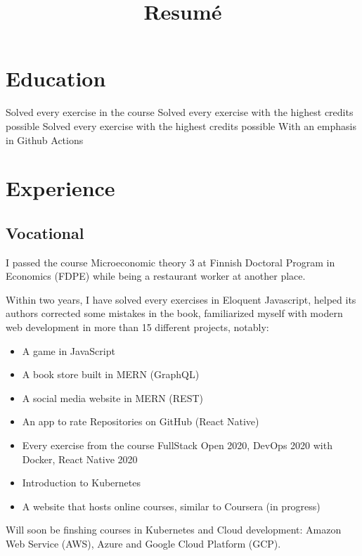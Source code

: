 \documentclass[11pt,a4paper,sans]{moderncv}
\title{Resumé}
\begin{document}
  \makecvtitle

  \section{Education}
  {}
  {Solved every exercise in the course}
  {Solved every exercise with the highest credits possible}
  {Solved every exercise with the highest credits possible}
  {With an emphasis in Github Actions}
  {}

  \section{Experience}
  \subsection{Vocational}
  {}
  {I passed the course Microeconomic theory 3 at Finnish Doctoral Program in Economics (FDPE)
  while being a restaurant worker at another place.}
  {Within two years, I have solved every exercises in Eloquent Javascript, helped its authors
  corrected some mistakes in the book, familiarized myself with modern web
  development in more than 15 different projects, notably:
  \begin{itemize}
    \item A game in JavaScript
    \item A book store built in MERN (GraphQL)
    \item A social media website in MERN (REST)
    \item An app to rate Repositories on GitHub (React Native)
    \item Every exercise from the course FullStack Open 2020, DevOps 2020 with Docker,
    React Native 2020
    \item Introduction to Kubernetes
    \item A website that hosts online courses, similar to Coursera (in progress)
  \end{itemize}
  Will soon be finshing courses in Kubernetes and Cloud
  development: Amazon Web Service (AWS), Azure and Google Cloud Platform (GCP).
  }
\end{document}

